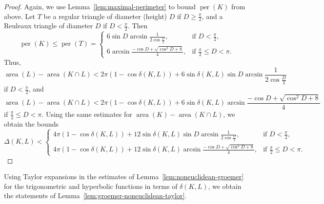 \documentclass[12pt,reqno]{amsart}
\newtheorem{lemma}[theorem]{Lemma}
\theoremstyle{remark}
\newcommand{\sph}{{\mathbb S}}
\newcommand{\M}{\mathcal{M}}
\DeclareMathOperator{\diam}{\mathrm{diam}}
\DeclareMathOperator{\per}{per}
\DeclareMathOperator{\area}{\mathrm{area}}
\begin{document}
\begin{proof}
Again, we use Lemma~\ref{lem:maximal-perimeter} to bound $\per (K)$ from above. Let $T$ be a regular triangle of diameter (height) $D$ if $D\geq\frac{\pi}{2}$, and a Reuleaux triangle of diameter $D$ if $D<\frac{\pi}{2}$. Then
\begin{equation}
\per (K)\leq\per (T)=\begin{cases}
    6\sin D \arcsin\frac{1}{2\cos\frac{D}{2}}, &\text{if }D<\frac{\pi}{2},\\
    6\arcsin\frac{-\cos D+\sqrt{\cos^2 D+8}}{4}, &\text{if }\frac{\pi}{2}\leq D<\pi.
\end{cases}
\end{equation}
Thus,
\begin{equation}
\area (L)-\area (K\cap L)<2\pi(1-\cos\delta(K,L))+6\sin\delta(K,L)\sin D \arcsin\frac{1}{2\cos\frac{D}{2}}
\end{equation}
if $D<\frac{\pi}{2}$, and
\begin{equation}
\area (L)-\area (K\cap L)<2\pi(1-\cos\delta(K,L))+6\sin\delta(K,L)\arcsin\frac{-\cos D+\sqrt{\cos^2 D+8}}{4}
\end{equation}
if $\frac{\pi}{2}\leq D<\pi$. Using the same estimates for $\area (K)-\area (K\cap L)$, we obtain the bounds
\begin{equation}
\Delta(K,L)<\begin{cases}
    4\pi(1-\cos\delta(K,L))+12\sin\delta(K,L)\sin D \arcsin\frac{1}{2\cos\frac{D}{2}}, &\text{if }D<\frac{\pi}{2},\\
    4\pi(1-\cos\delta(K,L))+12\sin\delta(K,L)\arcsin\frac{-\cos D+\sqrt{\cos^2 D+8}} {4}, &\text{if }\frac{\pi}{2}\leq D<\pi.
\end{cases}
\end{equation}
\end{proof}

Using Taylor expansions in the estimates of Lemma~\ref{lem:noneuclidean-groemer} for the trigonometric and hyperbolic functions in terms of $\delta(K,L)$, we obtain the statements of Lemma~\ref{lem:groemer-noneuclidean-taylor}.

\end{document}
